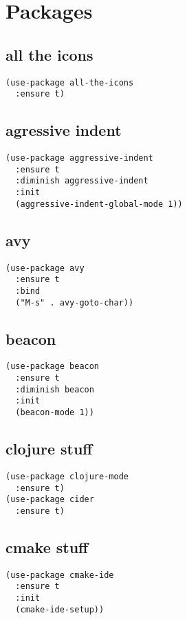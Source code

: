 \documentclass[11pt]{article}
\begin{document}
\section{Packages}
\label{sec-2}
\subsection{all the icons}
\label{sec-2-1}
\begin{verbatim}
(use-package all-the-icons
  :ensure t)
\end{verbatim}
\subsection{agressive indent}
\label{sec-2-2}
\begin{verbatim}
(use-package aggressive-indent
  :ensure t
  :diminish aggressive-indent
  :init
  (aggressive-indent-global-mode 1))
\end{verbatim}
\subsection{avy}
\label{sec-2-3}
\begin{verbatim}
(use-package avy
  :ensure t
  :bind
  ("M-s" . avy-goto-char))
\end{verbatim}
\subsection{beacon}
\label{sec-2-4}
\begin{verbatim}
(use-package beacon
  :ensure t
  :diminish beacon
  :init
  (beacon-mode 1))
\end{verbatim}
\subsection{clojure stuff}
\label{sec-2-5}
\begin{verbatim}
(use-package clojure-mode
  :ensure t)
(use-package cider
  :ensure t)
\end{verbatim}
\subsection{cmake stuff}
\label{sec-2-6}
\begin{verbatim}
(use-package cmake-ide
  :ensure t
  :init
  (cmake-ide-setup))
\end{verbatim}
\end{document}
